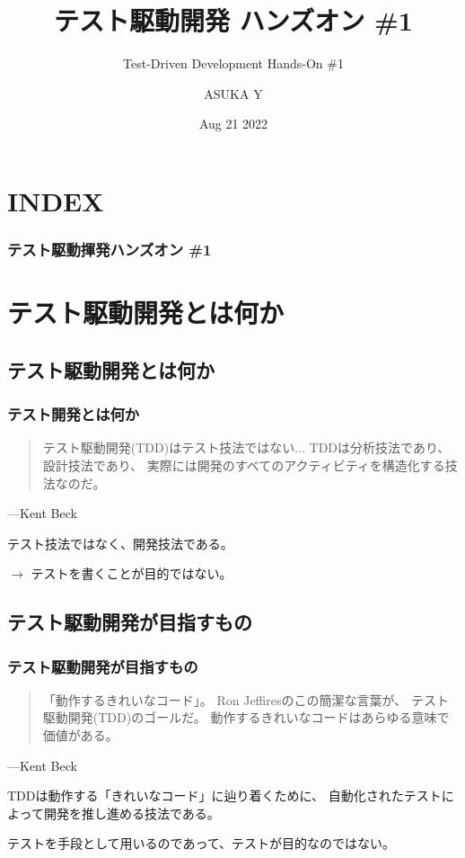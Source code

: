 \documentclass[aspectratio=169]{beamer}
\title{テスト駆動開発 ハンズオン \#1}
\subtitle{Test-Driven Development Hands-On \#1}
\author{ASUKA Y}
\date{Aug 21 2022}
\begin{document}
\begin{frame}
  \titlepage
\end{frame}

\section*{INDEX}
\begin{frame}
  \frametitle{テスト駆動揮発ハンズオン \#1}
  \tableofcontents
\end{frame}

\section{テスト駆動開発とは何か}
\subsection{テスト駆動開発とは何か}
\begin{frame}\frametitle{テスト開発とは何か}
  \begin{quote}
    テスト駆動開発(TDD)はテスト技法ではない...
    TDDは分析技法であり、設計技法であり、
    実際には開発のすべてのアクティビティを構造化する技法なのだ。
  \end{quote}
  \begin{flushright}
    ---Kent Beck
  \end{flushright}

  テスト技法ではなく、開発技法である。

  {
    \large \color{blue}
    $\rightarrow$
    テストを書くことが目的ではない。
  }
\end{frame}

\subsection{テスト駆動開発が目指すもの}
\begin{frame}\frametitle{テスト駆動開発が目指すもの}
  \begin{quote}
    「動作するきれいなコード」。
    Ron Jeffiresのこの簡潔な言葉が、
    テスト駆動開発(TDD)のゴールだ。
    動作するきれいなコードはあらゆる意味で価値がある。
  \end{quote}
  \begin{flushright}
    ---Kent Beck
  \end{flushright}

  TDDは動作する「きれいなコード」に辿り着くために、
  {\color{blue} 自動化されたテストによって開発を推し進める技法}である。

  \begin{center}
    \color{red} \large テストを手段として用いるのであって、テストが目的なのではない。
  \end{center}
\end{frame}
\end{document}
